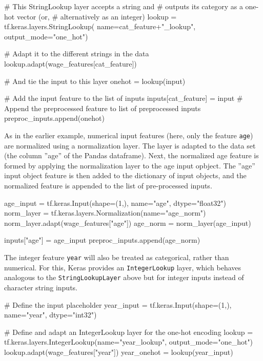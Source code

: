 \begin{withcode}
\begin{pythoncode}
    # This StringLookup layer accepts a string and 
    # outputs its category as a one-hot vector (or, 
    # alternatively as an integer)
    lookup = tf.keras.layers.StringLookup(
        name=cat_feature+"_lookup", output_mode="one_hot")

    # Adapt it to the different strings in the data
    lookup.adapt(wage_features[cat_feature])
    
    # And tie the input to this layer
    onehot = lookup(input)
    
    # Add the input feature to the list of inputs
    inputs[cat_feature] = input
    # Append the preprocessed feature to list of preprocessed inputs
    preproc_inputs.append(onehot)
\end{pythoncode}

As in the earlier example, numerical input features (here, only the feature \texttt{age}) are normalized using a normalization layer. The layer is adapted to the data set (the column ''age'' of the Pandas dataframe). Next, the normalized age feature is formed by applying the normalization layer to the age input opbject. The ''age'' input object feature is then added to the dictionary of input objects, and the normalized feature is appended to the list of pre-processed inputs. 

\begin{pythoncode}
age_input = tf.keras.Input(shape=(1,), name="age", dtype="float32")
norm_layer = tf.keras.layers.Normalization(name="age_norm")
norm_layer.adapt(wage_features["age"])
age_norm = norm_layer(age_input)

inputs["age"] = age_input
preproc_inputs.append(age_norm)
\end{pythoncode}

The integer feature \texttt{year} will also be treated as categorical, rather than numerical. For this, Keras provides an \texttt{IntegerLookup} layer, which behaves analogous to the \texttt{StringLookupLayer} above but for integer inputs instead of character string inputs.

\begin{pythoncode}
# Define the input placeholder
year_input = tf.keras.Input(shape=(1,), name="year", dtype="int32")

# Define and adapt an IntegerLookup layer for the one-hot encoding
lookup = tf.keras.layers.IntegerLookup(name="year_lookup",
                                       output_mode="one_hot")
lookup.adapt(wage_features["year"])
year_onehot = lookup(year_input)


\end{pythoncode}
\end{withcode}
